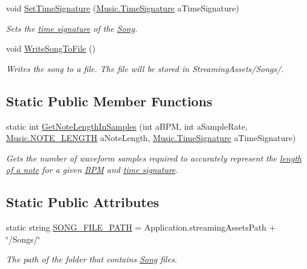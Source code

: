 \begin{DoxyCompactItemize}
void \hyperlink{group___song_pub_func_gaf9f2c7e6f4400f6f9854e68e70a49470}{Set\+Time\+Signature} (\hyperlink{group___music_structs_struct_music_1_1_time_signature}{Music.\+Time\+Signature} a\+Time\+Signature)
\begin{DoxyCompactList}\small\item\em Sets the \hyperlink{group___music_structs_struct_music_1_1_time_signature}{time signature} of the \hyperlink{class_song}{Song}. \end{DoxyCompactList}\item 
void \hyperlink{group___song_pub_func_ga70b0f6021c3b0590c561a88e3d1e5c2f}{Write\+Song\+To\+File} ()
\begin{DoxyCompactList}\small\item\em Writes the song to a file. The file will be stored in Streaming\+Assets/\+Songs/. \end{DoxyCompactList}\end{DoxyCompactItemize}
\subsection*{Static Public Member Functions}
\begin{DoxyCompactItemize}
\item 
static int \hyperlink{group___song_stat_func_ga03712f6defbff25d5a1cd964e4bc3211}{Get\+Note\+Length\+In\+Samples} (int a\+B\+PM, int a\+Sample\+Rate, \hyperlink{group___music_enums_gaf11b5f079adbb21c800b9eca1c5c3cbd}{Music.\+N\+O\+T\+E\+\_\+\+L\+E\+N\+G\+TH} a\+Note\+Length, \hyperlink{group___music_structs_struct_music_1_1_time_signature}{Music.\+Time\+Signature} a\+Time\+Signature)
\begin{DoxyCompactList}\small\item\em Gets the number of waveform samples required to accurately represent the \hyperlink{group___music_enums_gaf11b5f079adbb21c800b9eca1c5c3cbd}{length of a note} for a given \hyperlink{group___audio_DefBPM}{B\+PM} and \hyperlink{group___music_structs_struct_music_1_1_time_signature}{time signature}. \end{DoxyCompactList}\end{DoxyCompactItemize}
\subsection*{Static Public Attributes}
\begin{DoxyCompactItemize}
\item 
static string \hyperlink{group___song_const_ga95247572cf734f9e8b35973de4eeb1a4}{S\+O\+N\+G\+\_\+\+F\+I\+L\+E\+\_\+\+P\+A\+TH} = Application.\+streaming\+Assets\+Path + \char`\"{}/Songs/\char`\"{}
\begin{DoxyCompactList}\small\item\em The path of the folder that contains \hyperlink{class_song}{Song} files. \end{DoxyCompactList}\end{DoxyCompactItemize}
